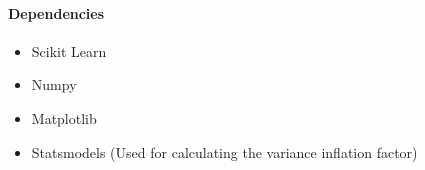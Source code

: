 \documentclass{article}
\begin{document}
\paragraph{Dependencies}
\begin{itemize}
    \item Scikit Learn~\autocite{scikitlearn}
    \item Numpy~\autocite{2020SciPyNMeth}
    \item Matplotlib~\autocite{hunter2007matplotlib}
    \item Statsmodels (Used for calculating the variance inflation factor)~\autocite{seabold2010statsmodels}
\end{itemize}{}
\newpage
\printbibliography
\newpage
\begin{appendices}

\end{appendices}
\end{document}
